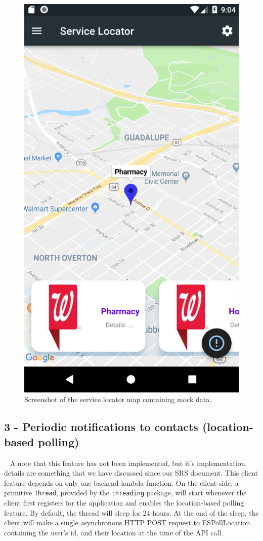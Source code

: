 \documentclass[10pt, a4paper]{article}
\begin{document}
\begin{figure}[H]
  \centerline{
  	\includegraphics[scale=.8]{img/service-locator.PNG}
  }  
  \caption{Screenshot of the service locator map containing mock data.}
\end{figure}

\subsection{3 - Periodic notifications to contacts (location-based polling)}
\par ~ A note that this feature has not been implemented, but it's implementation details are something that we have discussed since our SRS document. This client feature depends on only one backend lambda function. On the client side, a primitive \texttt{Thread}, provided by the \texttt{threading} package, will start whenever the client first registers for the application and enables the location-based polling feature. By default, the thread will sleep for 24 hours. At the end of the sleep, the client will make a single asynchronous HTTP POST request to ESPollLocation containing the user's id, and their location at the time of the API call.
\end{document}

